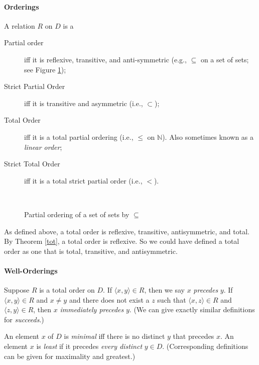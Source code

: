 \paragraph{Orderings}
\begin{definition}[Ordering]
  A relation $R$ on $D$ is a \begin{description}
    \item [Partial order] iff it is reflexive, transitive, and anti-symmetric (e.g., $\subseteq$ on a set of sets; see Figure \ref{fthree});
    \item [Strict Partial Order] iff it is transitive and asymmetric (i.e., $\subset$);
    \item [Total Order] iff it is a total partial ordering (i.e., $\leqslant$ on $\mathbb{N}$). Also sometimes known as a \emph{linear order};
    \item [Strict Total Order] iff it is a total strict partial order (i.e., $<$).
  \end{description} 
\end{definition}

\begin{figure}
  \centering ~{
  }\caption{Partial ordering of a set of sets by $\subseteq$\label{fthree}}
\end{figure}

As defined above, a total order is reflexive, transitive, antisymmetric, and total. By Theorem \ref{tot}, a total order is reflexive. So we could have defined a total order as one that is total, transitive, and antisymmetric.

\paragraph{Well-Orderings}

Suppose $R$ is a total order on $D$. If $\langle x,y\rangle\in R$, then we say $x$ \emph{precedes} $y$. If $\langle x,y\rangle \in R$ and $x\neq y$ and there does not exist a $z$ such that $\langle x,z\rangle \in R$ and $\langle z,y\rangle \in R$, then $x$ \emph{immediately precedes} $y$. (We can give exactly similar definitions for \emph{succeeds}.)

An element $x$ of $D$ is \emph{minimal} iff there is no distinct $y$ that precedes $x$. An element $x$ is \emph{least} if it precedes \emph{every distinct} $y \in D$. (Corresponding definitions can be given for maximality and greatest.)


